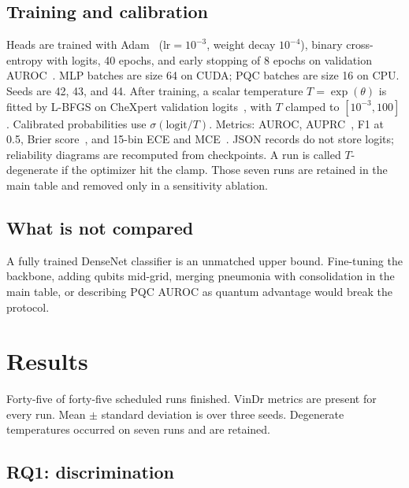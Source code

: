 \documentclass[11pt,a4paper]{article}
\begin{document}
\subsection{Training and calibration}

Heads are trained with Adam~\citep{kingma2015adam} ($\mathrm{lr}=10^{-3}$, weight decay $10^{-4}$), binary cross-entropy with logits, 40 epochs, and early stopping of 8 epochs on validation AUROC~\citep{hanley1982roc}. MLP batches are size 64 on CUDA; PQC batches are size 16 on CPU. Seeds are 42, 43, and 44. After training, a scalar temperature $T=\exp(\theta)$ is fitted by L-BFGS on CheXpert validation logits~\citep{guo2017calibration}, with $T$ clamped to $[10^{-3}, 100]$. Calibrated probabilities use $\sigma(\mathrm{logit}/T)$. Metrics: AUROC, AUPRC~\citep{davis2006pr}, F1 at 0.5, Brier score~\citep{brier1950verification}, and 15-bin ECE and MCE~\citep{naeini2015ece,guo2017calibration}. JSON records do not store logits; reliability diagrams are recomputed from checkpoints. A run is called $T$-degenerate if the optimizer hit the clamp. Those seven runs are retained in the main table and removed only in a sensitivity ablation.

\subsection{What is not compared}

A fully trained DenseNet classifier is an unmatched upper bound. Fine-tuning the backbone, adding qubits mid-grid, merging pneumonia with consolidation in the main table, or describing PQC AUROC as quantum advantage would break the protocol.

\section{Results}

Forty-five of forty-five scheduled runs finished. VinDr metrics are present for every run. Mean $\pm$ standard deviation is over three seeds. Degenerate temperatures occurred on seven runs and are retained.

\subsection{RQ1: discrimination}
\end{document}
